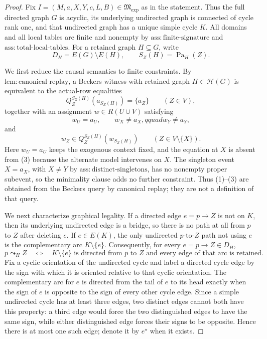 \documentclass{article}
\begin{document}
\begin{proof}
Fix \(I=(M,a,X,Y,c,L,B)\in\mathfrak M_{\mathrm{exp}}\) as in the statement.  Thus the full directed graph \(G\) is acyclic, its underlying undirected graph is connected of cycle rank one, and that undirected graph has a unique simple cycle \(K\).  All domains and all local tables are finite and nonempty by \(\mathrm{ass:finite\mbox{-}signature}\) and \(\mathrm{ass:total\mbox{-}local\mbox{-}tables}\).  For a retained graph \(H\subseteq G\), write
\[
 D_H=E(G)\setminus E(H),
 \qquad
 S_Z(H)=\operatorname{Pa}_H(Z).
\]

We first reduce the causal semantics to finite constraints.  By \(\mathrm{lem:canonical\mbox{-}replay}\), a Beckers witness with retained graph \(H\in\mathcal H(G)\) is equivalent to the actual-row equalities
\[
 Q_Z^{S_Z(H)}(a_{S_Z(H)})=\{a_Z\}
 \qquad (Z\in V),                                                     \tag{1}
\]
together with an assignment \(w\in R(U\cup V)\) satisfying
\[
 w_U=a_U,\qquad w_X\ne a_X,qquad w_Y\ne a_Y,                         \tag{2}
\]
and
\[
 w_Z\in Q_Z^{S_Z(H)}(w_{S_Z(H)})
 \qquad (Z\in V\setminus\{X\}).                                     \tag{3}
\]
Here \(w_U=a_U\) keeps the exogenous context fixed, and the equation at \(X\) is absent from (3) because the alternate model intervenes on \(X\).  The singleton event \(X=a_X\), with \(X\ne Y\) by \(\mathrm{ass:distinct\mbox{-}singletons}\), has no nonempty proper subevent, so the minimality clause adds no further constraint.  Thus (1)--(3) are obtained from the Beckers query by canonical replay; they are not a definition of that query.

We next characterize graphical legality.  If a directed edge \(e=p\to Z\) is not on \(K\), then its underlying undirected edge is a bridge, so there is no path at all from \(p\) to \(Z\) after deleting \(e\).  If \(e\in E(K)\), the only undirected \(p\)-to-\(Z\) path not using \(e\) is the complementary arc \(K\setminus\{e\}\).  Consequently, for every \(e=p\to Z\in D_H\),
\[
 p\leadsto_H Z
 \quad\Longleftrightarrow\quad
 K\setminus\{e\}\text{ is directed from \(p\) to \(Z\) and every edge of that arc is retained}.       \tag{4}
\]
Fix a cyclic orientation of the undirected cycle and label a directed cycle edge by the sign with which it is oriented relative to that cyclic orientation.  The complementary arc for \(e\) is directed from the tail of \(e\) to its head exactly when the sign of \(e\) is opposite to the sign of every other cycle edge.  Since a simple undirected cycle has at least three edges, two distinct edges cannot both have this property: a third edge would force the two distinguished edges to have the same sign, while either distinguished edge forces their signs to be opposite.  Hence there is at most one such edge; denote it by \(e^\star\) when it exists.


\end{proof}
\end{document}
